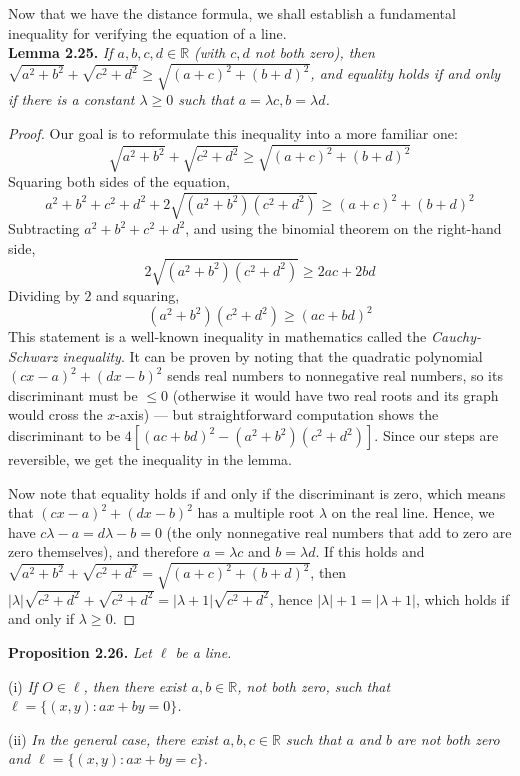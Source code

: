 \documentclass[leqno]{book}
\begin{document}
\noindent Now that we have the distance formula, we shall establish a fundamental inequality for verifying the equation of a line.\\

\noindent\textbf{Lemma 2.25.} \emph{If $a,b,c,d\in\mathbb R$ (with $c,d$ not both zero), then $\sqrt{a^2+b^2}+\sqrt{c^2+d^2}\geqslant\sqrt{(a+c)^2+(b+d)^2}$, and equality holds if and only if there is a constant $\lambda\geqslant 0$ such that $a=\lambda c,b=\lambda d$.}
\begin{proof}
Our goal is to reformulate this inequality into a more familiar one:
$$\sqrt{a^2+b^2}+\sqrt{c^2+d^2}\geqslant\sqrt{(a+c)^2+(b+d)^2}$$
Squaring both sides of the equation,
$$a^2+b^2+c^2+d^2+2\sqrt{(a^2+b^2)(c^2+d^2)}\geqslant(a+c)^2+(b+d)^2$$
Subtracting $a^2+b^2+c^2+d^2$, and using the binomial theorem on the right-hand side,
$$2\sqrt{(a^2+b^2)(c^2+d^2)}\geqslant 2ac+2bd$$
Dividing by $2$ and squaring,
$$(a^2+b^2)(c^2+d^2)\geqslant(ac+bd)^2$$
This statement is a well-known inequality in mathematics called the \emph{Cauchy-Schwarz inequality}.  It can be proven by noting that the quadratic polynomial $(cx-a)^2+(dx-b)^2$ sends real numbers to nonnegative real numbers, so its discriminant must be $\leqslant 0$ (otherwise it would have two real roots and its graph would cross the $x$-axis) \---- but straightforward computation shows the discriminant to be $4[(ac+bd)^2-(a^2+b^2)(c^2+d^2)]$.  Since our steps are reversible, we get the inequality in the lemma.

Now note that equality holds if and only if the discriminant is zero, which means that $(cx-a)^2+(dx-b)^2$ has a multiple root $\lambda$ on the real line.  Hence, we have $c\lambda-a=d\lambda-b=0$ (the only nonnegative real numbers that add to zero are zero themselves), and therefore $a=\lambda c$ and $b=\lambda d$.  If this holds and $\sqrt{a^2+b^2}+\sqrt{c^2+d^2}=\sqrt{(a+c)^2+(b+d)^2}$, then $|\lambda|\sqrt{c^2+d^2}+\sqrt{c^2+d^2}=|\lambda+1|\sqrt{c^2+d^2}$, hence $|\lambda|+1=|\lambda+1|$, which holds if and only if $\lambda\geqslant 0$.
\end{proof}
\noindent\textbf{Proposition 2.26.} \emph{Let $\ell$ be a line.}

(i) \emph{If $O\in\ell$, then there exist $a,b\in\mathbb R$, not both zero, such that $\ell=\{(x,y):ax+by=0\}$.}

(ii) \emph{In the general case, there exist $a,b,c\in\mathbb R$ such that $a$ and $b$ are not both zero and $\ell=\{(x,y):ax+by=c\}$.}
\end{document}
